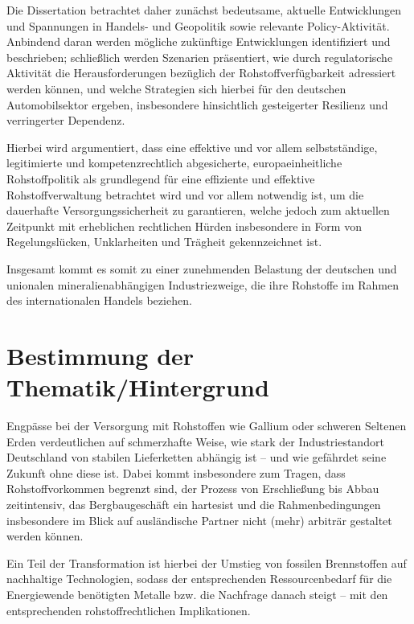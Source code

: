 \documentclass[12pt,a4paper,oneside]{book} %
\begin{document}
	Die Dissertation betrachtet daher zunächst bedeutsame, aktuelle Entwicklungen und Spannungen in Handels- und Geopolitik sowie relevante Policy-Aktivität. Anbindend daran werden mögliche zukünftige Entwicklungen identifiziert und beschrieben; schließlich werden Szenarien präsentiert, wie durch regulatorische Aktivität die Herausforderungen bezüglich der Rohstoffverfügbarkeit adressiert werden können, und welche Strategien sich hierbei für den deutschen Automobilsektor ergeben, insbesondere hinsichtlich gesteigerter Resilienz und verringerter Dependenz. 
	
	Hierbei wird argumentiert, dass eine effektive und vor allem selbstständige, legitimierte und kompetenzrechtlich abgesicherte, europaeinheitliche Rohstoffpolitik als grundlegend für eine effiziente und effektive Rohstoffverwaltung betrachtet wird und vor allem notwendig ist, um die dauerhafte Versorgungssicherheit zu garantieren, welche jedoch zum aktuellen Zeitpunkt mit erheblichen rechtlichen Hürden insbesondere in Form von Regelungslücken, Unklarheiten und Trägheit gekennzeichnet ist.
	
	Insgesamt kommt es somit zu einer zunehmenden Belastung der deutschen und unionalen mineralienabhängigen Industriezweige, die ihre Rohstoffe im Rahmen des internationalen Handels beziehen.
	
	
	\section{Bestimmung der Thematik/Hintergrund}
	Engpässe bei der Versorgung mit Rohstoffen wie Gallium oder schweren Seltenen Erden verdeutlichen auf schmerzhafte Weise, wie stark der Industriestandort Deutschland von stabilen Lieferketten abhängig ist – und wie gefährdet seine Zukunft ohne diese ist. Dabei kommt insbesondere zum Tragen, dass Rohstoffvorkommen begrenzt sind, der Prozess von Erschließung bis Abbau zeitintensiv, das Bergbaugeschäft ein \glqq hartes\grqq ist und die Rahmenbedingungen insbesondere im Blick auf ausländische Partner nicht (mehr) arbiträr gestaltet werden können.
	
	Ein Teil der Transformation ist hierbei der Umstieg von fossilen Brennstoffen auf nachhaltige Technologien, sodass der entsprechenden Ressourcenbedarf für die Energiewende benötigten Metalle bzw. die Nachfrage danach steigt\autocite{Driving factors for responsible sourcing in Europe: Motivations of renewable energy technology manufacturers} -- mit den entsprechenden rohstoffrechtlichen Implikationen.
	
\end{document}
